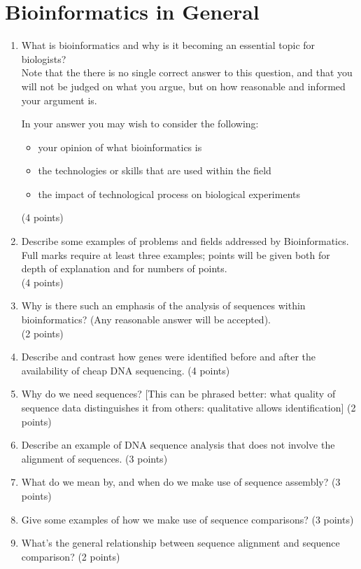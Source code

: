 \documentclass[11pt]{article}
\begin{document}
\section{Bioinformatics in General}
\begin{enumerate}
\item What is bioinformatics and why is it becoming an essential topic for
  biologists?\\
  Note that the there is no single correct answer to this question, and that
  you will not be judged on what you argue, but on how reasonable and informed
  your argument is.
  
  In your answer you may wish to consider the following:
  \begin{itemize}
  \item your opinion of what bioinformatics is
  \item the technologies or skills that are used within the field
  \item the impact of technological process on biological experiments
  \end{itemize}
  (4 points)
  \item Describe some examples of problems and fields addressed by
    Bioinformatics. Full marks require at least three examples; points
    will be given both for depth of explanation and for numbers of points.\\
    (4 points)
  \item Why is there such an emphasis of the analysis of sequences within
    bioinformatics? (Any reasonable answer will be accepted).\\
    (2 points)
  \item Describe and contrast how genes were identified before and after the
    availability of cheap DNA sequencing.
    (4 points)
  \item Why do we need sequences?  [This can be phrased better: what quality
    of sequence data distinguishes it from others: qualitative allows identification]
    (2 points)
  \item Describe an example of DNA sequence analysis that does not involve the
    alignment of sequences.
    (3 points)
  \item What do we mean by, and when do we make use of sequence assembly?
    (3 points)
  \item Give some examples of how we make use of sequence comparisons?
    (3 points)
  \item What's the general relationship between sequence alignment and
    sequence comparison?
    (2 points)
\end{enumerate}
\end{document}
